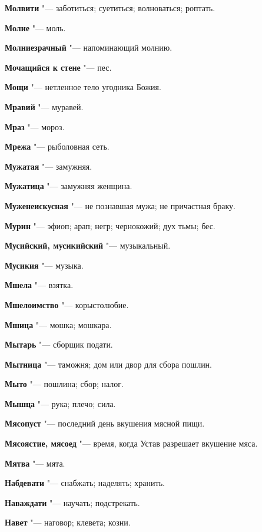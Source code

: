 \begin{mymulticols}
\noindent\textbf{Молвити} "--- заботиться; суетиться; волноваться; роптать. 

\noindent\textbf{Молие} "--- моль. 

\noindent\textbf{Молниезрачный} "--- напоминающий молнию. 

\noindent\textbf{Мочащийся к стене} "--- пес. 

\noindent\textbf{Мощи} "--- нетленное тело угодника Божия. 

\noindent\textbf{Мравий} "--- муравей. 

\noindent\textbf{Мраз} "--- мороз. 

\noindent\textbf{Мрежа} "--- рыболовная сеть. 

\noindent\textbf{Мужатая} "--- замужняя. 

\noindent\textbf{Мужатица} "--- замужняя женщина. 

\noindent\textbf{Муженеискусная} "--- не познавшая мужа; не причастная браку. 

\noindent\textbf{Мурин} "--- эфиоп; арап; негр; чернокожий; дух тьмы; бес. 

\noindent\textbf{Мусийский, мусикийский} "--- музыкальный. 

\noindent\textbf{Мусикия} "--- музыка. 

\noindent\textbf{Мшела} "--- взятка. 

\noindent\textbf{Мшелоимство} "--- корыстолюбие. 

\noindent\textbf{Мшица} "--- мошка; мошкара. 

\noindent\textbf{Мытарь} "--- сборщик подати. 

\noindent\textbf{Мытница} "--- таможня; дом или двор для сбора пошлин. 

\noindent\textbf{Мыто} "--- пошлина; сбор; налог. 

\noindent\textbf{Мышца} "--- рука; плечо; сила. 

\noindent\textbf{Мясопуст} "--- последний день вкушения мясной пищи. 

\noindent\textbf{Мясоястие, мясоед} "--- время, когда Устав разрешает вкушение мяса. 

\noindent\textbf{Мятва} "--- мята. 

\bukvaending


\noindent\textbf{Набдевати} "--- снабжать; наделять; хранить. 

\noindent\textbf{Наваждати} "--- научать; подстрекать. 

\noindent\textbf{Навет} "--- наговор; клевета; козни. 


\end{mymulticols}
